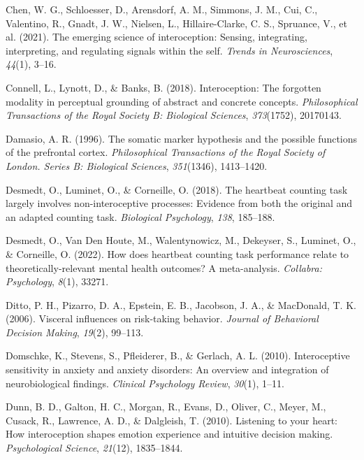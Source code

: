 \documentclass[
  man,mask,floatsintext]{apa6}
\newlength{\cslhangindent}
\newlength{\cslentryspacingunit} %
\newenvironment{CSLReferences}[2] %
 {%
  \setlength{\parindent}{0pt}
  \ifodd #1
  \let\oldpar\par
  \def\par{\hangindent=\cslhangindent\oldpar}
  \fi
  \setlength{\parskip}{#2\cslentryspacingunit}
 }%
 {}
\begin{document}
\begin{CSLReferences}{1}{0}
\leavevmode{}%
Chen, W. G., Schloesser, D., Arensdorf, A. M., Simmons, J. M., Cui, C., Valentino, R., Gnadt, J. W., Nielsen, L., Hillaire-Clarke, C. S., Spruance, V., et al. (2021). The emerging science of interoception: Sensing, integrating, interpreting, and regulating signals within the self. \emph{Trends in Neurosciences}, \emph{44}(1), 3--16.

\leavevmode{}%
Connell, L., Lynott, D., \& Banks, B. (2018). Interoception: The forgotten modality in perceptual grounding of abstract and concrete concepts. \emph{Philosophical Transactions of the Royal Society B: Biological Sciences}, \emph{373}(1752), 20170143.

\leavevmode{}%
Damasio, A. R. (1996). The somatic marker hypothesis and the possible functions of the prefrontal cortex. \emph{Philosophical Transactions of the Royal Society of London. Series B: Biological Sciences}, \emph{351}(1346), 1413--1420.

\leavevmode{}%
Desmedt, O., Luminet, O., \& Corneille, O. (2018). The heartbeat counting task largely involves non-interoceptive processes: Evidence from both the original and an adapted counting task. \emph{Biological Psychology}, \emph{138}, 185--188.

\leavevmode{}%
Desmedt, O., Van Den Houte, M., Walentynowicz, M., Dekeyser, S., Luminet, O., \& Corneille, O. (2022). How does heartbeat counting task performance relate to theoretically-relevant mental health outcomes? A meta-analysis. \emph{Collabra: Psychology}, \emph{8}(1), 33271.

\leavevmode{}%
Ditto, P. H., Pizarro, D. A., Epstein, E. B., Jacobson, J. A., \& MacDonald, T. K. (2006). Visceral influences on risk-taking behavior. \emph{Journal of Behavioral Decision Making}, \emph{19}(2), 99--113.

\leavevmode{}%
Domschke, K., Stevens, S., Pfleiderer, B., \& Gerlach, A. L. (2010). Interoceptive sensitivity in anxiety and anxiety disorders: An overview and integration of neurobiological findings. \emph{Clinical Psychology Review}, \emph{30}(1), 1--11.

\leavevmode{}%
Dunn, B. D., Galton, H. C., Morgan, R., Evans, D., Oliver, C., Meyer, M., Cusack, R., Lawrence, A. D., \& Dalgleish, T. (2010). Listening to your heart: How interoception shapes emotion experience and intuitive decision making. \emph{Psychological Science}, \emph{21}(12), 1835--1844.


\end{CSLReferences}
\end{document}
